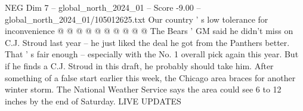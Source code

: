 \begin{textsample}{NEG Dim 7 – global\_north\_2024\_01 – Score -9.00 – global\_north\_2024\_01/105012625.txt}
Our country ' s low tolerance for inconvenience @ @ @ @ @ @ @ @ @ @ The Bears ' GM said he didn't miss on C.J.
Stroud last year -- he just liked the deal he got from the Panthers better.
That ' s fair enough -- especially with the No. 1 overall pick again this year.
But if he finds a C.J.
Stroud in this draft, he probably should take him.
After something of a false start earlier this week, the Chicago area braces for another winter storm.
The National Weather Service says the area could see 6 to 12 inches by the end of Saturday.
LIVE UPDATES

\end{textsample}
